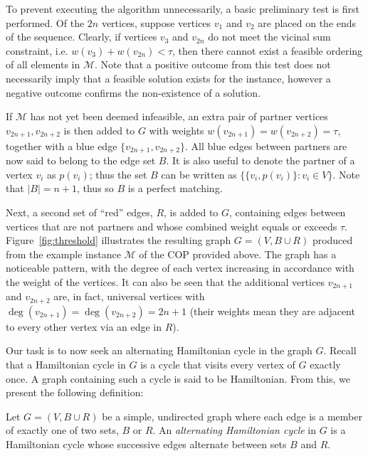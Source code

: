\documentclass[authoryear]{elsarticle}
\begin{document}
To prevent executing the algorithm unnecessarily, a basic preliminary test is first performed. Of the $2n$ vertices, suppose vertices $v_1$ and $v_2$ are placed on the ends of the sequence. Clearly, if vertices $v_3$ and $v_{2n}$ do not meet the vicinal sum constraint, i.e. $w(v_3) + w(v_{2n}) < \tau$, then there cannot exist a feasible ordering of all elements in $\mathcal{M}$. Note that a positive outcome from this test does not necessarily imply that a feasible solution exists for the instance, however a negative outcome confirms the non-existence of a solution.

If $\mathcal{M}$ has not yet been deemed infeasible, an extra pair of partner vertices $v_{2n+1}, v_{2n+2}$ is then added to $G$ with weights $w(v_{2n+1}) = w(v_{2n+2}) = \tau$, together with a blue edge $\{v_{2n+1}, v_{2n+2}\}$. All blue edges between partners are now said to belong to the edge set $B$. It is also useful to denote the partner of a vertex $v_i$ as $p(v_i)$; thus the set $B$ can be written as $\{\{v_i, p(v_i)\} : v_i \in V\}$. Note that $|B| = n+1$, thus so $B$ is a perfect matching. 

Next, a second set of ``red'' edges, $R$, is added to $G$, containing edges between vertices that are not partners and whose combined weight equals or exceeds $\tau$. Figure~\ref{fig:threshold} illustrates the resulting graph $G = (V, B \cup R)$ produced from the example instance $\mathcal{M}$ of the COP provided above. The graph has a noticeable pattern, with the degree of each vertex increasing in accordance with the weight of the vertices. It can also be seen that the additional vertices $v_{2n+1}$ and $v_{2n+2}$ are, in fact, universal vertices with $\deg(v_{2n+1}) = \deg(v_{2n+2}) = 2n+1$ (their weights mean they are adjacent to every other vertex via an edge in $R$).

Our task is to now seek an alternating Hamiltonian cycle in the graph $G$. Recall that a Hamiltonian cycle in $G$ is a cycle that visits every vertex of $G$ exactly once. A graph containing such a cycle is said to be Hamiltonian. From this, we present the following definition:

\begin{definition} %
	\label{defn:althamcycle}
	Let $G = (V, B \cup R)$ be a simple, undirected graph where each edge is a member of exactly one of two sets, $B$ or $R$. An \emph{alternating Hamiltonian cycle} in $G$ is a Hamiltonian cycle whose successive edges alternate between sets $B$ and $R$.
\end{definition}
\end{document}
